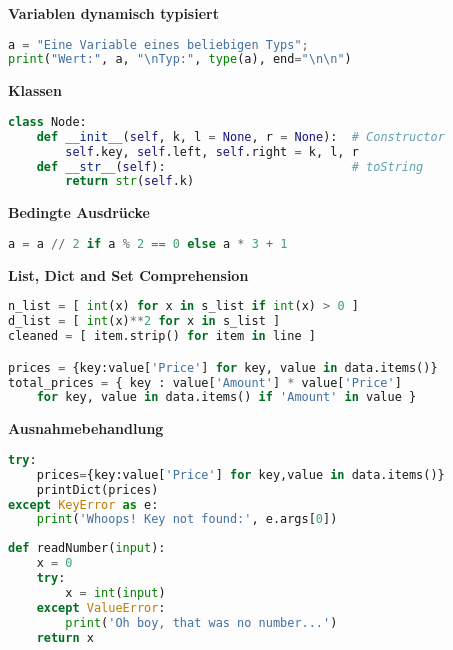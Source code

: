 \documentclass[german]{latex4ei/latex4ei_sheet}
\begin{document}
\begin{sectionbox}
\textbf{Variablen dynamisch typisiert}\vspace{-4px}
\begin{lstlisting}[language=Python]
a = "Eine Variable eines beliebigen Typs";
print("Wert:", a, "\nTyp:", type(a), end="\n\n")
\end{lstlisting}


\textbf{Klassen}\vspace{-4px}
\begin{lstlisting}[language=Python]
class Node:
    def __init__(self, k, l = None, r = None):  # Constructor
        self.key, self.left, self.right = k, l, r
    def __str__(self):                          # toString
        return str(self.k)
\end{lstlisting}

\textbf{Bedingte Ausdrücke}\vspace{-4px}
\begin{lstlisting}[language=Python]
a = a // 2 if a % 2 == 0 else a * 3 + 1
\end{lstlisting}

\textbf{List, Dict and Set Comprehension}\vspace{-4px}
\begin{lstlisting}[language=Python]
n_list = [ int(x) for x in s_list if int(x) > 0 ]
d_list = [ int(x)**2 for x in s_list ]
cleaned = [ item.strip() for item in line ]

prices = {key:value['Price'] for key, value in data.items()}
total_prices = { key : value['Amount'] * value['Price'] 
    for key, value in data.items() if 'Amount' in value }
\end{lstlisting}

\textbf{Ausnahmebehandlung}\vspace{-4px}
\begin{lstlisting}[language=Python]
try:
    prices={key:value['Price'] for key,value in data.items()}
    printDict(prices)
except KeyError as e:
    print('Whoops! Key not found:', e.args[0])
\end{lstlisting}\vspace{-6px}

\begin{lstlisting}[language=Python]
def readNumber(input):
    x = 0
    try:
        x = int(input)
    except ValueError:
        print('Oh boy, that was no number...')
    return x
\end{lstlisting}\vspace{-6px}

\end{sectionbox}
\end{document}
